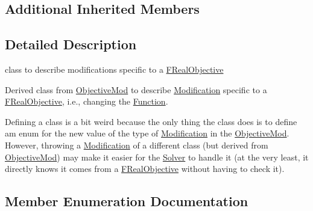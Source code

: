 \subsection*{Additional Inherited Members}


\subsection{Detailed Description}
class to describe modifications specific to a \mbox{\hyperlink{class_s_m_spp__di__unipi__it_1_1_f_real_objective}{F\+Real\+Objective}} 

Derived class from \mbox{\hyperlink{class_s_m_spp__di__unipi__it_1_1_objective_mod}{Objective\+Mod}} to describe \mbox{\hyperlink{class_s_m_spp__di__unipi__it_1_1_modification}{Modification}} specific to a \mbox{\hyperlink{class_s_m_spp__di__unipi__it_1_1_f_real_objective}{F\+Real\+Objective}}, i.\+e., changing the \mbox{\hyperlink{class_s_m_spp__di__unipi__it_1_1_function}{Function}}.

Defining a class is a bit weird because the only thing the class does is to define am enum for the new value of the type of \mbox{\hyperlink{class_s_m_spp__di__unipi__it_1_1_modification}{Modification}} in the \mbox{\hyperlink{class_s_m_spp__di__unipi__it_1_1_objective_mod}{Objective\+Mod}}. However, throwing a \mbox{\hyperlink{class_s_m_spp__di__unipi__it_1_1_modification}{Modification}} of a different class (but derived from \mbox{\hyperlink{class_s_m_spp__di__unipi__it_1_1_objective_mod}{Objective\+Mod}}) may make it easier for the \mbox{\hyperlink{class_s_m_spp__di__unipi__it_1_1_solver}{Solver}} to handle it (at the very least, it directly knows it comes from a \mbox{\hyperlink{class_s_m_spp__di__unipi__it_1_1_f_real_objective}{F\+Real\+Objective}} without having to check it). 

\subsection{Member Enumeration Documentation}
\mbox{\label{class_s_m_spp__di__unipi__it_1_1_f_real_objective_mod_a10f9cfdc831c025f33e97e51a22e32a3}} 
